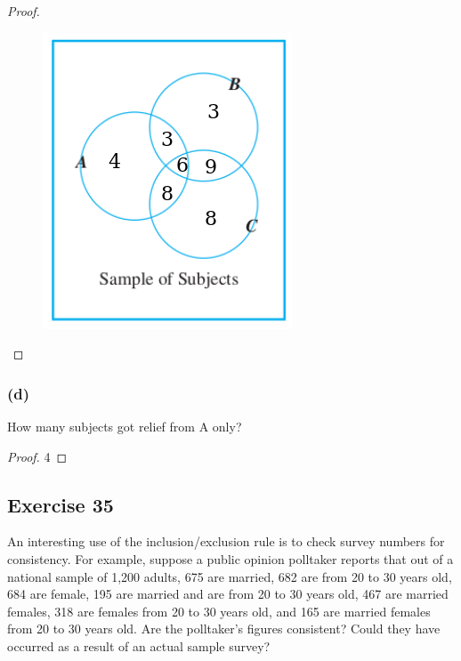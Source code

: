 \documentclass[14pt]{extarticle}
\begin{document}
\begin{proof}
\begin{figure}[ht!]
\centering
\includegraphics[scale=0.5]{../images/9.3.34.c.2.png}
\end{figure}
\end{proof}

\subsubsection{(d)}
How many subjects got relief from A only?

\begin{proof}
4
\end{proof}

\subsection{Exercise 35}
An interesting use of the inclusion/exclusion rule is to check survey numbers for consistency. For example, suppose 
a public opinion polltaker reports that out of a national sample of 1,200 adults, 675 are married, 682 are from 20 to 
30 years old, 684 are female, 195 are married and are from 20 to 30 years old, 467 are married females, 318 are 
females from 20 to 30 years old, and 165 are married females from 20 to 30 years old. Are the polltaker’s 
figures consistent? Could they have occurred as a result of an actual sample survey?
\end{document}
